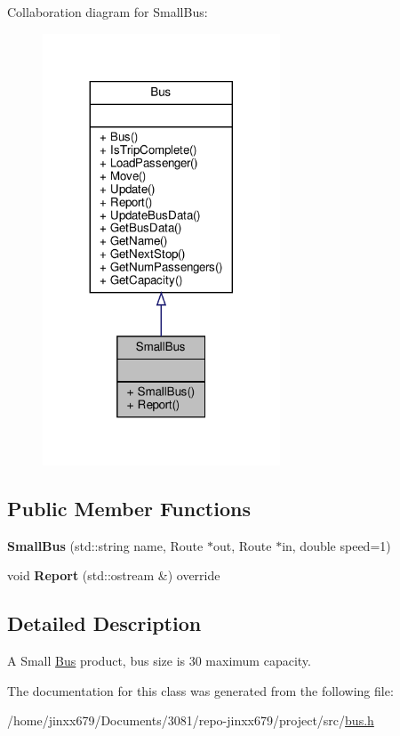 Collaboration diagram for Small\+Bus\+:\nopagebreak
\begin{figure}[H]
\begin{center}
\leavevmode
\includegraphics[width=200pt]{classSmallBus__coll__graph}
\end{center}
\end{figure}
\subsection*{Public Member Functions}
\begin{DoxyCompactItemize}
\item 
\mbox{\label{classSmallBus_a44623f798fe5ca47c6cf2ffa1276e92e}} 
{\bfseries Small\+Bus} (std\+::string name, Route $\ast$out, Route $\ast$in, double speed=1)
\item 
\mbox{\label{classSmallBus_a5759f6dd8c3738962730b6f0e28a9c05}} 
void {\bfseries Report} (std\+::ostream \&) override
\end{DoxyCompactItemize}


\subsection{Detailed Description}
A Small \hyperlink{classBus}{Bus} product, bus size is 30 maximum capacity. 

The documentation for this class was generated from the following file\+:\begin{DoxyCompactItemize}
\item 
/home/jinxx679/\+Documents/3081/repo-\/jinxx679/project/src/\hyperlink{bus_8h}{bus.\+h}\end{DoxyCompactItemize}
